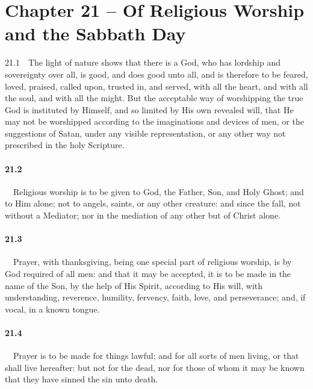 \section{Chapter 21 -- Of Religious Worship and the Sabbath Day} 21.1\ \ The light of nature shows that there is a God, who has lordship and sovereignty over all, is good, and does good unto all, and is therefore to be feared, loved, praised, called upon, trusted in, and served, with all the heart, and with all the soul, and with all the might. But the acceptable way of worshipping the true God is instituted by Himself, and so limited by His own revealed will, that He may not be worshipped according to the imaginations and devices of men, or the suggestions of Satan, under any visible representation, or any other way not prescribed in the holy Scripture.   
\bigskip
\paragraph{21.2}\ \ Religious worship is to be given to God, the Father, Son, and Holy Ghost; and to Him alone; not to angels, saints, or any other creature: and since the fall, not without a Mediator; nor in the mediation of any other but of Christ alone.   
\bigskip
\paragraph{21.3}\ \ Prayer, with thanksgiving, being one special part of religious worship, is by God required of all men: and that it may be accepted, it is to be made in the name of the Son, by the help of His Spirit, according to His will, with understanding, reverence, humility, fervency, faith, love, and perseverance; and, if vocal, in a known tongue.   
\bigskip
\paragraph{21.4}\ \ Prayer is to be made for things lawful; and for all sorts of men living, or that shall live hereafter: but not for the dead, nor for those of whom it may be known that they have sinned the sin unto death.   
\bigskip

